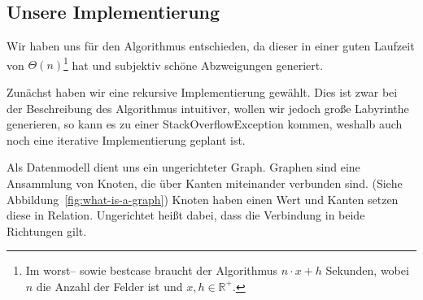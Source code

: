 \subsection{Unsere Implementierung}\label{subsec:unsere-implementierung}
    \begin{figure}[ht!]
        
    \end{figure}
Wir haben uns für den  Algorithmus entschieden, da dieser in einer guten Laufzeit von $\Theta(n)$\footnote{Im worst-- sowie bestcase braucht der Algorithmus $n\cdot x+h$ Sekunden, wobei $n$ die Anzahl der Felder ist und $x,h\in\mathbb{R}^+$.} hat und subjektiv schöne Abzweigungen generiert.


Zunächst haben wir eine rekursive Implementierung gewählt.
Dies ist zwar bei der Beschreibung des Algorithmus intuitiver, wollen wir jedoch große Labyrinthe generieren, so kann es zu einer StackOverflowException kommen, weshalb auch noch eine iterative Implementierung geplant ist.

Als Datenmodell dient uns ein ungerichteter Graph.
Graphen sind eine Ansammlung von Knoten, die über Kanten miteinander verbunden sind.
(Siehe Abbildung~\ref{fig:what-is-a-graph})
Knoten haben einen Wert und Kanten setzen diese in Relation.
Ungerichtet heißt dabei, dass die Verbindung in beide Richtungen gilt.

